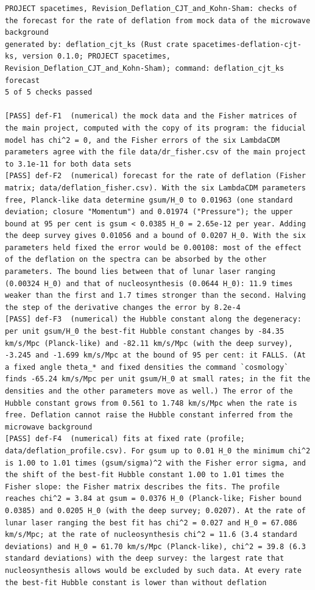 \documentclass[
  10pt,
]{article}
\begin{document}
\begin{verbatim}
PROJECT spacetimes, Revision_Deflation_CJT_and_Kohn-Sham: checks of the forecast for the rate of deflation from mock data of the microwave background
generated by: deflation_cjt_ks (Rust crate spacetimes-deflation-cjt-ks, version 0.1.0; PROJECT spacetimes, Revision_Deflation_CJT_and_Kohn-Sham); command: deflation_cjt_ks forecast
5 of 5 checks passed

[PASS] def-F1  (numerical) the mock data and the Fisher matrices of the main project, computed with the copy of its program: the fiducial model has chi^2 = 0, and the Fisher errors of the six LambdaCDM parameters agree with the file data/dr_fisher.csv of the main project to 3.1e-11 for both data sets
[PASS] def-F2  (numerical) forecast for the rate of deflation (Fisher matrix; data/deflation_fisher.csv). With the six LambdaCDM parameters free, Planck-like data determine gsum/H_0 to 0.01963 (one standard deviation; closure "Momentum") and 0.01974 ("Pressure"); the upper bound at 95 per cent is gsum < 0.0385 H_0 = 2.65e-12 per year. Adding the deep survey gives 0.01056 and a bound of 0.0207 H_0. With the six parameters held fixed the error would be 0.00108: most of the effect of the deflation on the spectra can be absorbed by the other parameters. The bound lies between that of lunar laser ranging (0.00324 H_0) and that of nucleosynthesis (0.0644 H_0): 11.9 times weaker than the first and 1.7 times stronger than the second. Halving the step of the derivative changes the error by 8.2e-4
[PASS] def-F3  (numerical) the Hubble constant along the degeneracy: per unit gsum/H_0 the best-fit Hubble constant changes by -84.35 km/s/Mpc (Planck-like) and -82.11 km/s/Mpc (with the deep survey), -3.245 and -1.699 km/s/Mpc at the bound of 95 per cent: it FALLS. (At a fixed angle theta_* and fixed densities the command `cosmology` finds -65.24 km/s/Mpc per unit gsum/H_0 at small rates; in the fit the densities and the other parameters move as well.) The error of the Hubble constant grows from 0.561 to 1.748 km/s/Mpc when the rate is free. Deflation cannot raise the Hubble constant inferred from the microwave background
[PASS] def-F4  (numerical) fits at fixed rate (profile; data/deflation_profile.csv). For gsum up to 0.01 H_0 the minimum chi^2 is 1.00 to 1.01 times (gsum/sigma)^2 with the Fisher error sigma, and the shift of the best-fit Hubble constant 1.00 to 1.01 times the Fisher slope: the Fisher matrix describes the fits. The profile reaches chi^2 = 3.84 at gsum = 0.0376 H_0 (Planck-like; Fisher bound 0.0385) and 0.0205 H_0 (with the deep survey; 0.0207). At the rate of lunar laser ranging the best fit has chi^2 = 0.027 and H_0 = 67.086 km/s/Mpc; at the rate of nucleosynthesis chi^2 = 11.6 (3.4 standard deviations) and H_0 = 61.70 km/s/Mpc (Planck-like), chi^2 = 39.8 (6.3 standard deviations) with the deep survey: the largest rate that nucleosynthesis allows would be excluded by such data. At every rate the best-fit Hubble constant is lower than without deflation

\end{verbatim}
\end{document}
